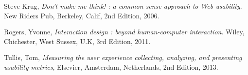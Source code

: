 \begin{thebibliography}{9}

  Steve Krug,
  \emph{Don't make me think! : a common sense approach to Web usability}.
  New Riders Pub, Berkeley, Calif,
  2nd Edition,
  2006.

Rogers, Yvonne,
 \emph{Interaction design : beyond human-computer interaction}.
 Wiley, Chichester, West Sussex, U.K,
 3rd Edition,
 2011.
 
 Tullis, Tom,
 \emph{Measuring the user experience collecting, analyzing, and presenting usability metrics},
 Elsevier, Amsterdam, Netherlands,
 2nd Edition,
  2013.
 
\end{thebibliography}
